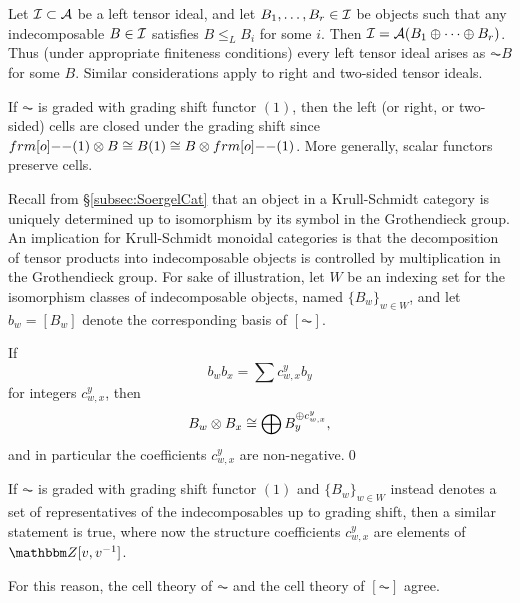 \begin{remark}
Let ${\mathcal{I}}\subset {\mathcal{A}}$ be a left tensor  ideal, and let $B_1,\ldots,B_r \in {\mathcal{I}}$ be objects such that any indecomposable $B\in {\mathcal{I}}$ satisfies $B\leq_{L} B_i$ for some $i$.  Then ${\mathcal{I}} = {\mathcal{A}}(B_1\oplus \cdots \oplus B_r)$.  Thus (under appropriate finiteness conditions) every left tensor ideal arises as $\AC B$ for some $B$.  Similar considerations apply to right and two-sided tensor ideals. 
\end{remark}

\begin{remark} If $\AC$ is graded with grading shift functor $(1)$, then the left (or right, or two-sided) cells are closed under the grading shift since $\one(1)\otimes B\cong
B(1)\cong B\otimes \one(1)$.  More generally, scalar functors preserve cells.\end{remark}

Recall from \S\ref{subsec:SoergelCat} that an object in a Krull-Schmidt category is uniquely determined up to isomorphism by its symbol in the Grothendieck group. An implication for Krull-Schmidt monoidal categories is that the decomposition of tensor products into indecomposable objects is controlled by multiplication in the Grothendieck group. For sake of illustration, let $W$ be an indexing set for the isomorphism classes of indecomposable objects, named $\{B_w\}_{w \in W}$, and let $b_w = [B_w]$ denote the corresponding basis of $[\AC]$.


\begin{proposition}\label{prop:structureCoeffs}
If
\begin{equation} \label{eq:multdownstairs} b_w b_x = \sum c^y_{w,x} b_y \end{equation}
for integers $c^y_{w,x}$, then
\begin{equation} \label{eq:multupstairs} B_w \otimes B_x \cong \bigoplus B_y^{\oplus c^y_{w,x}},\end{equation}
and in particular the coefficients $c^y_{w,x}$ are non-negative.\qed
\end{proposition}
If $\AC$ is graded with grading shift functor $(1)$ and $\{B_w\}_{w\in W}$ instead denotes a set of representatives of the indecomposables up to grading shift, then a similar statement is true, where now the structure coefficients $c^y_{w,x}$ are elements of $\Z[v,v\inv]$.

For this reason, the cell theory of $\AC$ and the cell theory of $[\AC]$ agree.


